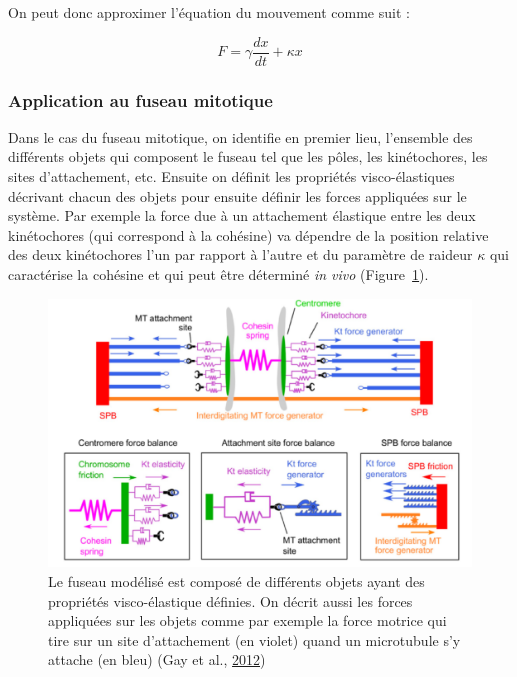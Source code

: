 \documentclass[12pt,a4paper,twoside,openright]{book}
\begin{document}
On peut donc approximer l'équation du mouvement comme suit :

\[
F = \gamma\frac{dx}{dt} + \kappa x
\]

\subsubsection{Application au fuseau
mitotique}\label{application-au-fuseau-mitotique}

Dans le cas du fuseau mitotique, on identifie en premier lieu,
l'ensemble des différents objets qui composent le fuseau tel que les
pôles, les kinétochores, les sites d'attachement, etc. Ensuite on
définit les propriétés visco-élastiques décrivant chacun des objets pour
ensuite définir les forces appliquées sur le système. Par exemple la
force due à un attachement élastique entre les deux kinétochores (qui
correspond à la cohésine) va dépendre de la position relative des deux
kinétochores l'un par rapport à l'autre et du paramètre de raideur
\(\kappa\) qui caractérise la cohésine et qui peut être déterminé
\emph{in vivo} (Figure~\ref{fig:spindle_model}).

\begin{figure}[htbp]
\centering
\includegraphics{figures/results/modelling/spindle_model.png}
\caption[Modélisation mécanique du fuseau mitotique]{\label{fig:spindle_model}Le
fuseau modélisé est composé de différents objets ayant des propriétés
visco-élastique définies. On décrit aussi les forces appliquées sur les
objets comme par exemple la force motrice qui tire sur un site
d'attachement (en violet) quand un microtubule s'y attache (en bleu)
(Gay et al., \hyperref[ref-Gay2012a]{2012})}
\end{figure}
\end{document}
